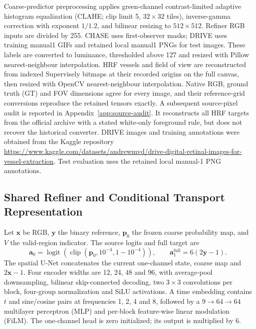 \documentclass[jimaging,article,submit,pdftex,moreauthors]{Definitions/mdpi}
\begin{document}
Coarse-predictor preprocessing applies green-channel contrast-limited
adaptive histogram equalization (CLAHE; clip limit 5,
$32\times32$ tiles), inverse-gamma correction with exponent $1/1.2$, and
bilinear resizing to $512\times512$. Refiner RGB inputs are divided by 255.
CHASE uses first-observer masks; DRIVE uses training manual1 GIFs and retained
local manual1 PNGs for test images. These labels are converted to luminance,
thresholded above 127 and resized with Pillow nearest-neighbour interpolation.
HRF vessels and field of view are reconstructed from indexed Supervisely
bitmaps at their recorded origins on the full canvas, then resized with OpenCV
nearest-neighbour interpolation. Native RGB, ground truth (GT) and FOV
dimensions agree for every
image, and their reference-grid conversions reproduce the retained tensors
exactly. A subsequent source-pixel audit is reported in Appendix~\ref{app:source-audit}.
It reconstructs all HRF targets from the official archive with a stated
white-only foreground rule, but does not recover the historical converter.
DRIVE images and training annotations were obtained from the Kaggle
repository \url{https://www.kaggle.com/datasets/andrewmvd/drive-digital-retinal-images-for-vessel-extraction}.
Test evaluation uses the retained local manual-1 PNG annotations.

\subsection{Shared Refiner and Conditional Transport Representation}
Let $\mathbf{x}$ be RGB, $\mathbf{y}$ the binary reference,
$\mathbf{p}_0$ the frozen coarse probability map, and $V$ the valid-region
indicator. The source logits and full target are
\begin{equation}
\mathbf{a}_0=\operatorname{logit}\!\left(\operatorname{clip}
 (\mathbf{p}_0,10^{-4},1-10^{-4})\right),\qquad
\mathbf{a}_1^{\mathrm{full}}=6(2\mathbf{y}-1).
\label{eq:source-target}
\end{equation}
The spatial U-Net concatenates the current one-channel state, coarse map and
$2\mathbf{x}-1$. Four encoder widths are 12, 24, 48 and 96, with average-pool
downsampling, bilinear skip-connected decoding, two $3\times3$ convolutions
per block, four-group normalization and SiLU activations. A time embedding
contains $t$ and sine/cosine pairs at frequencies 1, 2, 4 and 8, followed by a
$9\!\to\!64\!\to\!64$ multilayer perceptron (MLP) and per-block
feature-wise linear modulation (FiLM). The one-channel head is zero
initialized; its output is multiplied by 6.
\end{document}
